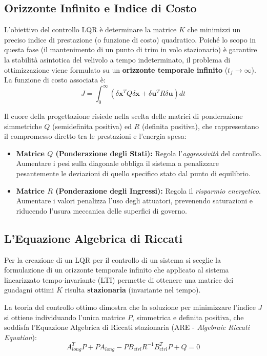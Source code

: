 \subsection{Orizzonte Infinito e Indice di Costo}
L'obiettivo del controllo LQR è determinare la matrice $K$ che minimizzi un preciso indice di prestazione (o funzione di costo) quadratico. Poiché lo scopo in questa fase (il mantenimento di un punto di trim in volo stazionario) è garantire la stabilità asintotica del velivolo a tempo indeterminato, il problema di ottimizzazione viene formulato su un \textbf{orizzonte temporale infinito} ($t_f \to \infty$). La funzione di costo associata è:
\begin{equation}
    J = \int_{0}^{\infty} \left( \delta\mathbf{x}^T Q \delta\mathbf{x} + \delta\mathbf{u}^T R \delta\mathbf{u} \right) dt
\end{equation}

Il cuore della progettazione risiede nella scelta delle matrici di ponderazione simmetriche $Q$ (semidefinita positiva) ed $R$ (definita positiva), che rappresentano il compromesso diretto tra le prestazioni e l'energia spesa:
\begin{itemize}
    \item \textbf{Matrice $Q$ (Ponderazione degli Stati):} Regola l'\textit{aggressività} del controllo. Aumentare i pesi sulla diagonale obbliga il sistema a penalizzare pesantemente le deviazioni di quello specifico stato dal punto di equilibrio.
    \item \textbf{Matrice $R$ (Ponderazione degli Ingressi):} Regola il \textit{risparmio energetico}. Aumentare i valori penalizza l'uso degli attuatori, prevenendo saturazioni e riducendo l'usura meccanica delle superfici di governo.
\end{itemize}

\subsection{L'Equazione Algebrica di Riccati}
Per la creazione di un LQR per il controllo di un sistema si sceglie la formulazione di un orizzonte temporale infinito che applicato al sistema linearizzato tempo-invariante (LTI)  permette di ottenere una matrice dei guadagni ottimi $K$ risulta \textbf{stazionaria} (invariante nel tempo). 

La teoria del controllo ottimo dimostra che la soluzione per minimizzare l'indice $J$ si ottiene individuando l'unica matrice $P$, simmetrica e definita positiva, che soddisfa l'Equazione Algebrica di Riccati stazionaria (ARE - \textit{Algebraic Riccati Equation}):
\begin{equation}
    A_{long}^T P + P A_{long} - P B_{ctrl} R^{-1} B_{ctrl}^T P + Q = 0
\end{equation}

